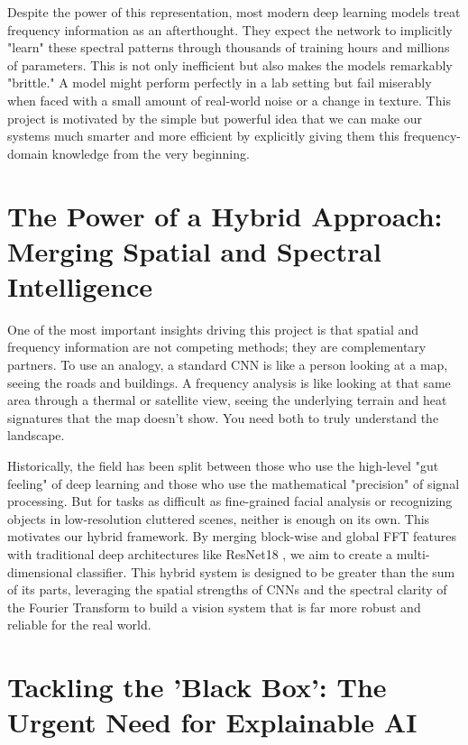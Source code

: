 Despite the power of this representation, most modern deep learning models treat frequency information as an afterthought. They expect the network to implicitly "learn" these spectral patterns through thousands of training hours and millions of parameters. This is not only inefficient but also makes the models remarkably "brittle." A model might perform perfectly in a lab setting but fail miserably when faced with a small amount of real-world noise or a change in texture. This project is motivated by the simple but powerful idea that we can make our systems much smarter and more efficient by explicitly giving them this frequency-domain knowledge from the very beginning.

\section{The Power of a Hybrid Approach: Merging Spatial and Spectral Intelligence}

One of the most important insights driving this project is that spatial and frequency information are not competing methods; they are complementary partners. To use an analogy, a standard CNN is like a person looking at a map, seeing the roads and buildings. A frequency analysis is like looking at that same area through a thermal or satellite view, seeing the underlying terrain and heat signatures that the map doesn't show. You need both to truly understand the landscape.

Historically, the field has been split between those who use the high-level "gut feeling" of deep learning and those who use the mathematical "precision" of signal processing. But for tasks as difficult as fine-grained facial analysis or recognizing objects in low-resolution cluttered scenes, neither is enough on its own. This motivates our hybrid framework. By merging block-wise and global FFT features with traditional deep architectures like ResNet18 \cite{resnet}, we aim to create a multi-dimensional classifier. This hybrid system is designed to be greater than the sum of its parts, leveraging the spatial strengths of CNNs and the spectral clarity of the Fourier Transform to build a vision system that is far more robust and reliable for the real world.

\section{Tackling the 'Black Box': The Urgent Need for Explainable AI}


